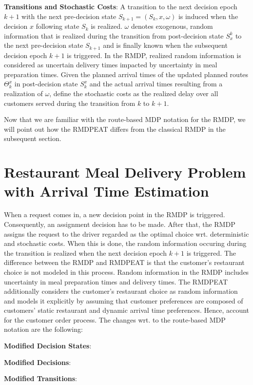 \begin{description}[font=$\bullet$\scshape\bfseries]
	\item \textbf{Transitions and Stochastic Costs}: A transition to the next decision epoch $ k+1 $  with the next pre-decision state $ S_{k+1} = (S_k, x, \omega) $ is induced when the decision $ x $ following state $ S_k $ is realized. $ \omega $ denotes exogenous, random information that is realized during the transition from post-decision state $ S^{k}_x $ to the next pre-decision state $ S_{k+1} $ and is finally known when the subsequent decision epoch $ k+1 $ is triggered. In the RMDP, realized random information is considered as uncertain delivery times impacted by uncertainty in meal preparation times. Given the planned arrival times of the updated planned routes $ \Theta^{x}_k $ in post-decision state $ S^{x}_k $ and the actual arrival times resulting from a realization of $ \omega $, \cite{UlmerBarrett2017_TWAP} define the stochastic costs as the realized delay over all customers served during the transition from $ k $ to $ k+1 $.
\end{description}

Now that we are familiar with the route-based MDP notation for the RMDP, we will point out how the RMDPEAT differs from the classical RMDP in the subsequent section. 
\section{Restaurant Meal Delivery Problem with Arrival Time Estimation}

When a request comes in, a new decision point in the RMDP is triggered. Consequently, an assignment decision has to be made. After that, the RMDP assigns the request to the driver regarded as the optimal choice wrt. deterministic and stochastic costs. When this is done, the random information occuring during the transition is realized when the next decision epoch $ k+1 $ is triggered. The difference between the RMDP and RMDPEAT is that the customer's restaurant choice is not modeled in this process. Random information in the RMDP includes uncertainty in meal preparation times and delivery times. The RMDPEAT additionally considers the customer's restaurant choice as random information and models it explicitly by assuming that customer preferences are composed of customers' static restaurant and dynamic arrival time preferences. Hence, \cite{Hildebrandt2020_EAT} account for the customer order process. The changes wrt. to the route-based MDP notation are the following:
\begin{description}[font=$\bullet$\scshape\bfseries]
	\item \textbf{Modified Decision States}: 
	\item \textbf{Modified Decisions}:
	\item \textbf{Modified Transitions}: 
\end{description}

